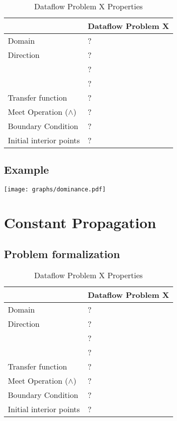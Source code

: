 \documentclass{article}
\begin{document}
\begin{table}[H]
\centering
\begin{tabular}{|p{}|p{}|}
\hline
 & \textbf{Dataflow Problem X} \\
\hline
Domain & ? \\
\hline
Direction & ? \\
 & ? \\
 & ? \\
\hline
Transfer function & ? \\
\hline
Meet Operation ($\wedge$) & ? \\
\hline
Boundary Condition & ? \\
\hline
Initial interior points & ? \\
\hline
\end{tabular}
\caption{Dataflow Problem X Properties}
\label{tab:dataflow_problem_x}
\end{table}

\subsection{Example}

\texttt{[image: graphs/dominance.pdf]}

\section{Constant Propagation}

\subsection{Problem formalization}

\begin{table}[H]
\centering
\begin{tabular}{|p{}|p{}|}
\hline
 & \textbf{Dataflow Problem X} \\
\hline
Domain & ? \\
\hline
Direction & ? \\
 & ? \\
 & ? \\
\hline
Transfer function & ? \\
\hline
Meet Operation ($\wedge$) & ? \\
\hline
Boundary Condition & ? \\
\hline
Initial interior points & ? \\
\hline
\end{tabular}
\caption{Dataflow Problem X Properties}
\label{tab:dataflow_problem_x}
\end{table}
\end{document}

